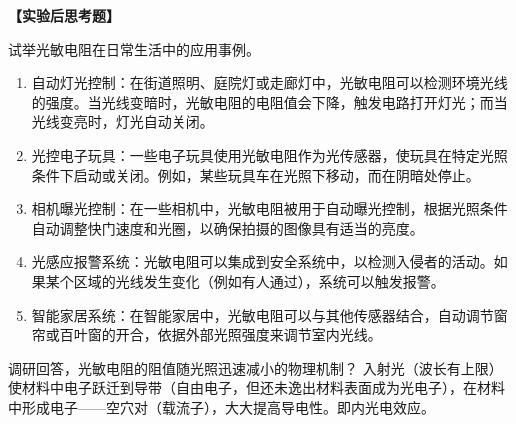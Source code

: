 \documentclass[dvipsnames, svgnames,a4paper,11pt]{article}
\begin{document}
\textbf{【实验后思考题】}
\begin{question}
	试举光敏电阻在日常生活中的应用事例。
	\tcblower
	\begin{enumerate}
		\item 自动灯光控制：在街道照明、庭院灯或走廊灯中，光敏电阻可以检测环境光线的强度。当光线变暗时，光敏电阻的电阻值会下降，触发电路打开灯光；而当光线变亮时，灯光自动关闭。
		\item 光控电子玩具：一些电子玩具使用光敏电阻作为光传感器，使玩具在特定光照条件下启动或关闭。例如，某些玩具车在光照下移动，而在阴暗处停止。
		\item 相机曝光控制：在一些相机中，光敏电阻被用于自动曝光控制，根据光照条件自动调整快门速度和光圈，以确保拍摄的图像具有适当的亮度。
		\item 光感应报警系统：光敏电阻可以集成到安全系统中，以检测入侵者的活动。如果某个区域的光线发生变化（例如有人通过），系统可以触发报警。
		\item 智能家居系统：在智能家居中，光敏电阻可以与其他传感器结合，自动调节窗帘或百叶窗的开合，依据外部光照强度来调节室内光线。
	\end{enumerate}
\end{question}
\begin{question}
	调研回答，光敏电阻的阻值随光照迅速减小的物理机制？
	\tcblower
	入射光（波长有上限）使材料中电子跃迁到导带（自由电子，但还未逸出材料表面成为光电子），在材料中形成电子——空穴对（载流子），大大提高导电性。即内光电效应。
\end{question}
\clearpage




\clearpage
\appendix
\appendixpage
\addappheadtotoc
\end{document}
